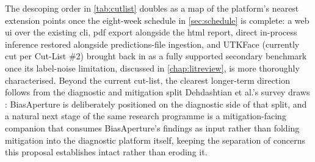 The descoping order in \cref{tab:cutlist} doubles as a map of the platform's nearest extension points once the eight-week schedule in \cref{sec:schedule} is complete: a web \gls{ui} over the existing \gls{cli}, \gls{pdf} export alongside the \gls{html} report, direct in-process inference restored alongside predictions-file ingestion, and UTKFace (currently cut per Cut-List \#2) brought back in as a fully supported secondary benchmark once its label-noise limitation, discussed in \cref{chap:litreview}, is more thoroughly characterised. Beyond the current cut-list, the clearest longer-term direction follows from the diagnostic and mitigation split Dehdashtian et al.'s survey draws \cite{dehdashtian2024survey}: BiasAperture is deliberately positioned on the diagnostic side of that split, and a natural next stage of the same research programme is a mitigation-facing companion that consumes BiasAperture's findings as input rather than folding mitigation into the diagnostic platform itself, keeping the separation of concerns this proposal establishes intact rather than eroding it.
